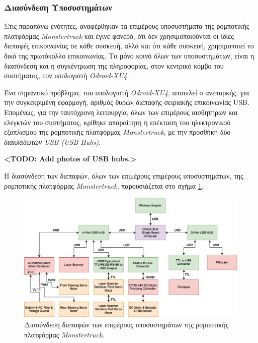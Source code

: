 \bigskip
\subsubsection{Διασύνδεση Υποσυστημάτων}
Στις παραπάνω ενότητες, αναφέρθηκαν τα επιμέρους υποσυστήματα της ρομποτικής πλατφόρμας \textit{Monstertruck} και έγινε φανερό, ότι δεν χρησιμοποιούνται οι ίδιες διεπαφές επικοινωνίας σε κάθε συσκευή, αλλά και ότι κάθε συσκευή, χρησιμοποιεί το δικό της πρωτόκολλο επικοινωνίας. Το μόνο κοινό όλων των υποσυστημάτων, είναι η διασύνδεση και η συγκέντρωση της πληροφορίας, στον κεντρικό κόμβο του συστήματος, τον υπολογιστή \textit{Odroid-XU4}.

\bigskip
Ένα σημαντικό πρόβλημα, του υπολογιστή \textit{Odroid-XU4}, αποτελεί ο ανεπαρκής, για την συγκεκριμένη εφαρμογή, αριθμός θυρών διεπαφής σειριακής επικοινωνίας USB. Επομένως, για την ταυτόχρονη λειτουργία, όλων των επιμέρους αισθητήρων και ελεγκτών του συστήματος, κρίθηκε απαραίτητη η επέκταση του ηλεκτρονικού εξοπλισμού της ρομποτικής πλατφόρμας \textit{Monstertruck}, με την προσθήκη δύο \textit{διακλαδωτών USB (USB Hubs)}.

\bigskip
\textbf{<TODO: Add photos of USB hubs.>}

\bigskip
Η διασύνδεση των διεπαφών, όλων των επιμέρους επιμέρους υποσυστημάτων, της ρομποτικής πλατφόρμας \textit{Monstertruck}, παρουσιάζεται στο σχήμα \ref{fig:hardware_interface_diagram}.

\begin{figure}[!ht]
	\centering
	\includegraphics[width=0.9\linewidth]{Chapters/Chapter2/Figures/hardware_interface_diagram.png}
	\caption{Διασύνδεση διεπαφών των επιμέρους υποσυστημάτων της ρομποτικής πλατφόρμας \textit{Monstertruck}.}
	\label{fig:hardware_interface_diagram}
\end{figure}


\bigskip

